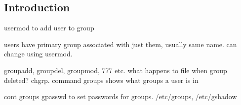 
\subsection{Introduction}

usermod to add user to group

users have primary group associated with just them, usually same name.
can change using usermod.

groupadd, groupdel, groupmod, 777 etc. what happens to file when group deleted? chgrp. command groups shows what groups a user is in



cont groups gpasswd to set passwords for groups. /etc/groups, /etc/gshadow

